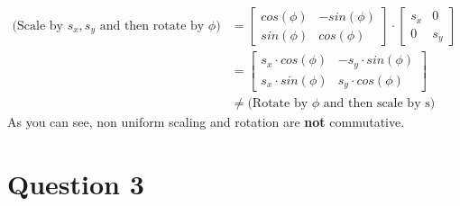 \documentclass{article} %
\begin{document}
\begin{enumerate}[a)]
\begin{align*}
\text{(Scale by $s_x, s_y$ and then rotate by $\phi$)} &=
\left[
\begin{matrix}
cos(\phi) & -sin(\phi)\\
sin(\phi) & cos(\phi)
\end{matrix}
\right]
\cdot
\left[
\begin{matrix}
s_x & 0\\
0 & s_y
\end{matrix}
\right]
\\
&= \left[
\begin{matrix}
s_x \cdot cos(\phi)  & -s_y \cdot sin(\phi)\\
s_x \cdot sin(\phi) & s_y \cdot cos(\phi)
\end{matrix}
\right]\\
&\neq \text{(Rotate by $\phi$ and then scale by s)}
\end{align*}
As you can see, non uniform scaling and rotation are \textbf{not} commutative.


\end{enumerate}



\section{Question 3}
\end{document}
